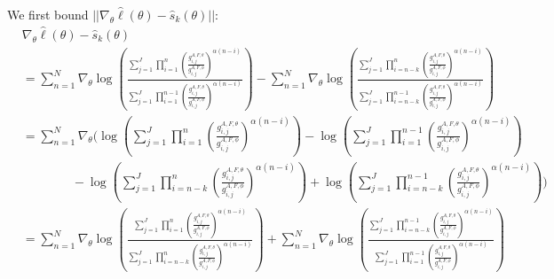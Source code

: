 \documentclass{article}
\begin{document}
We first bound $||\nabla_\theta\hat\ell(\theta) - \hat s_k(\theta)||$:
\begin{align*}
    &\nabla_\theta\hat\ell(\theta) - \hat s_k(\theta) \\
    &= \sum_{n=1}^N \nabla_\theta \log\left(\frac{\sum_{j=1}^J\prod_{i=1}^n\left(\frac{g_{i,j}^{A,F,\theta}}{g_{i,j}^{A,F,\phi}} \right)^{\alpha(n-i)}}{\sum_{j=1}^J\prod_{i=1}^{n-1}\left(\frac{g_{i,j}^{A,F,\theta}}{g_{i,j}^{A,F,\phi}} \right)^{\alpha(n-i)}}\right) - \sum_{n=1}^N \nabla_\theta\log\left(\frac{\sum_{j=1}^J\prod_{i=n-k}^n\left(\frac{g_{i,j}^{A,F,\theta}}{g_{i,j}^{A,F,\phi}} \right)^{\alpha(n-i)}}{\sum_{j=1}^J\prod_{i=n-k}^{n-1}\left(\frac{g_{i,j}^{A,F,\theta}}{g_{i,j}^{A,F,\phi}} \right)^{\alpha(n-i)}}\right) \\
    &= \sum_{n=1}^N \nabla_\theta \Bigg(\log\left(\sum_{j=1}^J\prod_{i=1}^n\left(\frac{g_{i,j}^{A,F,\theta}}{g_{i,j}^{A,F,\phi}} \right)^{\alpha(n-i)}\right)- \log\left(\sum_{j=1}^J\prod_{i=1}^{n-1}\left(\frac{g_{i,j}^{A,F,\theta}}{g_{i,j}^{A,F,\phi}} \right)^{\alpha(n-i)}\right)\\
    &\qquad\qquad -\log\left(\sum_{j=1}^J\prod_{i=n-k}^n\left(\frac{g_{i,j}^{A,F,\theta}}{g_{i,j}^{A,F,\phi}} \right)^{\alpha(n-i)}\right) + \log\left(\sum_{j=1}^J\prod_{i=n-k}^{n-1}\left(\frac{g_{i,j}^{A,F,\theta}}{g_{i,j}^{A,F,\phi}} \right)^{\alpha(n-i)}\right)\Bigg) \\
    &=  \sum_{n=1}^N \nabla_\theta \log\left(\frac{\sum_{j=1}^J\prod_{i=1}^n\left(\frac{g_{i,j}^{A,F,\theta}}{g_{i,j}^{A,F,\phi}} \right)^{\alpha(n-i)}}{\sum_{j=1}^J\prod_{i=n-k}^{n}\left(\frac{g_{i,j}^{A,F,\theta}}{g_{i,j}^{A,F,\phi}} \right)^{\alpha(n-i)}}\right) + \sum_{n=1}^N \nabla_\theta\log\left(\frac{\sum_{j=1}^J\prod_{i=n-k}^{n-1}\left(\frac{g_{i,j}^{A,F,\theta}}{g_{i,j}^{A,F,\phi}} \right)^{\alpha(n-i)}}{\sum_{j=1}^J\prod_{i=1}^{n-1}\left(\frac{g_{i,j}^{A,F,\theta}}{g_{i,j}^{A,F,\phi}} \right)^{\alpha(n-i)}}\right) 
\end{align*}
\end{document}
